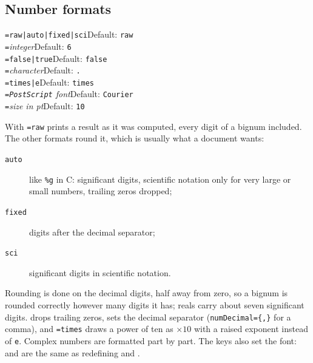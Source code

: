 \documentclass[11pt,english,BCOR=10mm,DIV=12,bibliography=totoc,parskip=false,
   headings=small,headinclude=false,footinclude=false,oneside]{pst-doc}
\DeclareRobustCommand\PS{\texttt{PostScript}\xspace}
\begin{document}
\subsection{Number formats}

\begin{BDef}
\texttt{=raw|auto|fixed|sci}\quad Default: \texttt{raw}\\
\texttt{=}\textit{integer}\quad Default: \texttt{6}\\
\texttt{=false|true}\quad Default: \texttt{false}\\
\texttt{=}\textit{character}\quad Default: \texttt{.}\\
\texttt{=times|e}\quad Default: \texttt{times}\\
\texttt{=}\textit{\PS font}\quad Default: \texttt{Courier}\\
\texttt{=}\textit{size in pt}\quad Default: \texttt{10}
\end{BDef}

With \texttt{=raw}  prints a result
as it was computed, every digit of a bignum included. The other formats
round it, which is usually what a document wants:

\begin{description}
\item[\texttt{auto}] like \texttt{\%g} in C: 
  significant digits, scientific notation only for very large or small
  numbers, trailing zeros dropped;
\item[\texttt{fixed}]  digits after the decimal
  separator;
\item[\texttt{sci}]  significant digits in scientific
  notation.
\end{description}

Rounding is done on the decimal digits, half away from zero, so a bignum is
rounded correctly however many digits it has; reals carry about seven
significant digits.  drops trailing zeros,
 sets the decimal separator (\texttt{numDecimal=\{,\}}
for a comma), and \texttt{=times} draws a power of ten
as $\times10$ with a raised exponent instead of \texttt{e}. Complex numbers
are formatted part by part. The keys also set the font:
 and  are the same as redefining
 and .
\end{document}
